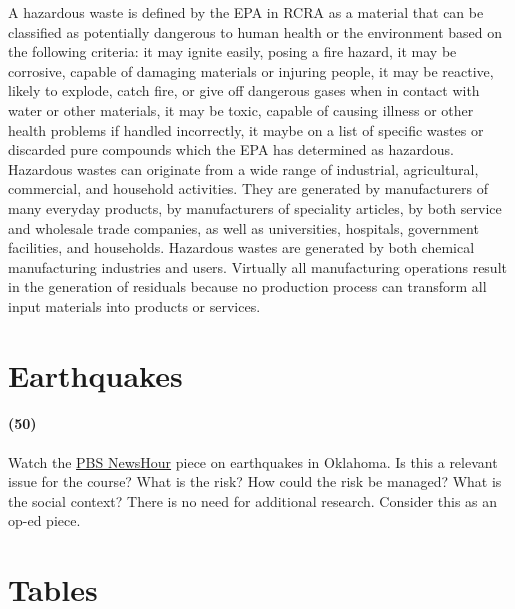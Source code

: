 \documentclass[11pt,a4paper]{article}
\makeatletter
\renewcommand\listoftables{%
    \@starttoc{lot}%
}
\makeatother
\begin{document}
\noindent A hazardous waste is defined by the EPA in RCRA as a material that can be classified as potentially dangerous to human health or the environment based on the following criteria: it may ignite easily, posing a fire hazard, it may be corrosive, capable of damaging materials or injuring people, it may be reactive, likely to explode, catch fire, or give off dangerous gases when in contact with water or other materials, it may be toxic, capable of causing illness or other health problems if handled incorrectly, it maybe on a list of specific wastes or discarded pure compounds which the EPA has determined as hazardous.\\

\noindent Hazardous wastes can originate from a wide range of industrial, agricultural, commercial, and household activities. They are generated by manufacturers of many everyday products, by manufacturers of speciality articles, by both service and wholesale trade companies, as well as universities, hospitals, government facilities, and households. Hazardous wastes are generated by both chemical manufacturing industries and users. Virtually all manufacturing operations result in the generation of residuals because no production process can transform all input materials into products or services.




\newpage
        
\section{Earthquakes}
\paragraph*{(50)}
Watch the \href{https://youtu.be/csbdeOfhKTM}{PBS NewsHour} piece on earthquakes in Oklahoma. Is this a relevant issue for the course? What is the risk? How could the risk be managed? What is the social context? There is no need for additional research. Consider this as an op-ed piece.

        
        
        
        
\newpage

\section*{Tables}

{%
\let\oldnumberline\numberline%
\renewcommand{\numberline}{\tablename~\oldnumberline}%
\listoftables%
}
\end{document}
